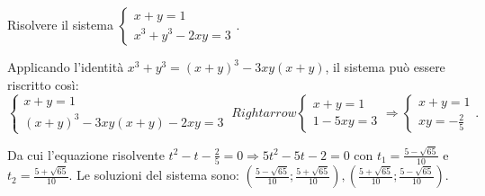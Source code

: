 \begin{esempio}{}{}
Risolvere il sistema 
\(\left\{\begin{array}{l}{x+y=1}\\{x^3+y^3-2{xy}=3}\end{array}\right.\).

Applicando l'identità \(x^3+y^3=(x+y)^3-3{xy}(x+y)\), il sistema può essere 
riscritto così: \[ 
\left\{\begin{array}{l}{x+y=1}\\{(x+y)^3-3{xy}(x+y)-2{xy}=3}\end{array}\right.\
Rightarrow 
\left\{\begin{array}{l}{x+y=1}\\{1-5{xy}=3}\end{array}\right.\Rightarrow 
\left\{\begin{array}{l}{x+y=1}\\{{xy}=-\frac 2 5}\end{array}\right..\]

Da cui l'equazione risolvente \(t^2-t-\frac 2 5=0\Rightarrow 5t^2-5t-2=0\) con 
\(t_1=\frac{5-\sqrt{65}}{10}\) e \(t_2=\frac{5+\sqrt{65}}{10}\).
Le soluzioni del sistema sono: 
\(\left(\frac{5-\sqrt{65}}{10};\frac{5+\sqrt{65}}{10}\right),\left(\frac{5+\sqrt
{65}}{10};\frac{5-\sqrt{65}}{10}\right)\).
\end{esempio}

